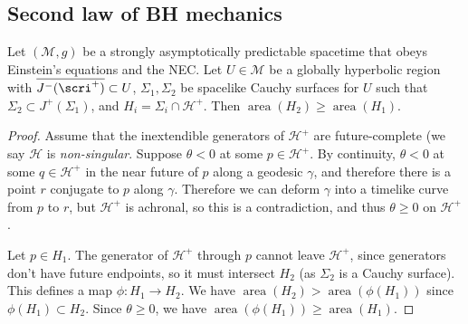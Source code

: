 \documentclass{jknotes}
\begin{document}
\subsection{Second law of BH mechanics}
\begin{theorem}
    Let \((\mathcal{M},g)\) be a strongly asymptotically predictable spacetime that obeys Einstein's equations and the NEC. Let \(U\in\mathcal{M}\) be a globally hyperbolic region with \(\overline{J^-(\scri^+)}\subset U\), \(\Sigma_1,\Sigma_2\) be spacelike Cauchy surfaces for \(U\) such that \(\Sigma_2 \subset J^+(\Sigma_1)\), and \(H_i = \Sigma_i \cap \mathcal{H}^+\). Then \(\operatorname{area}(H_2)\ge\operatorname{area}(H_1)\).
\end{theorem}

\begin{figure}[H]
    \centering
\end{figure}
\begin{proof}
    Assume that the inextendible generators of \(\mathcal{H}^+\) are future-complete (we say \(\mathcal{H}\) is \emph{non-singular}. Suppose \(\theta < 0\) at some \(p \in \mathcal{H}^+\). By continuity, \(\theta < 0\) at some \(q \in \mathcal{H}^+\) in the near future of \(p\) along a geodesic \(\gamma\), and therefore there is a point \(r\) conjugate to \(p\) along \(\gamma\). Therefore we can deform \(\gamma\) into a timelike curve from \(p\) to \(r\), but \(\mathcal{H}^+\) is achronal, so this is a contradiction, and thus \(\theta \ge 0\) on \(\mathcal{H}^+\).

    Let \(p\in H_1\). The generator of \(\mathcal{H}^+\) through \(p\) cannot leave \(\mathcal{H}^+\), since generators don't have future endpoints, so it must intersect \(H_2\) (as \(\Sigma_2\) is a Cauchy surface). This defines a map \(\phi:H_1\to H_2\). We have \(\operatorname{area}(H_2)>\operatorname{area}(\phi(H_1))\) since \(\phi(H_1)\subset H_2\). Since \(\theta \ge 0\), we have \(\operatorname{area}(\phi(H_1))\ge\operatorname{area}(H_1)\).
\end{proof}
\end{document}
